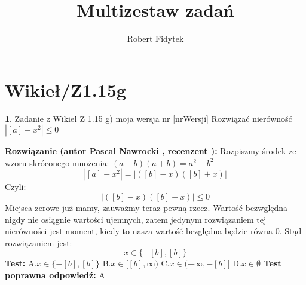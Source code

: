 \documentclass[12pt, a4paper]{article}
\title{Multizestaw zadań}
\author{Robert Fidytek}
\date{}
\theoremstyle{definition} %
\newtheorem{zad}{}
\newcommand{\kategoria}[1]{\section{#1}} %
\newcommand{\zadStart}[1]{\begin{zad}#1\newline} %
\newcommand{\zadStop}{\end{zad}}   %
\newcommand{\rozwStart}[2]{\noindent \textbf{Rozwiązanie (autor #1 , recenzent #2): }\newline} %
\newcommand{\odpStop}{\newline}                                             %
\newcommand{\testStart}{\noindent \textbf{Test:}\newline} %
\newcommand{\testStop}{\newline} %
\newcommand{\kluczStart}{\noindent \textbf{Test poprawna odpowiedź:}\newline} %
\newcommand{\kluczStop}{\newline} %
\begin{document}
\maketitle



\kategoria{Wikieł/Z1.15g}
\zadStart{Zadanie z Wikieł Z 1.15 g) moja wersja nr [nrWersji]}
Rozwiązać nierówność $|[a]-x^2|\leq0$
\zadStop
\rozwStart{Pascal Nawrocki}{}
Rozpiszmy środek ze wzoru skróconego mnożenia: $(a-b)(a+b)=a^2-b^2$
$$|[a]-x^2|=|([b]-x)([b]+x)|$$
Czyli:
$$|([b]-x)([b]+x)|\leq0$$
Miejsca zerowe już mamy, zauważmy teraz pewną rzecz. Wartość bezwględna nigdy nie osiągnie wartości ujemnych, zatem jedynym rozwiązaniem tej nierówności jest moment, kiedy to nasza wartość bezględna będzie równa 0. Stąd rozwiązaniem jest:
$$x\in\{-[b],[b]\}$$
\odpStop
\testStart
A.$x\in\{-[b],[b]\}$
B.$x\in[[b],\infty)$
C.$x\in(-\infty,-[b]]$
D.$x\in\emptyset$
\testStop
\kluczStart
A
\kluczStop
\end{document}
